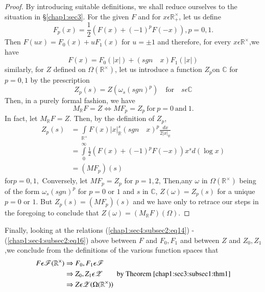 \begin{proof}
  By introducing suitable definitions, we shall reduce ourselves
  to the situation in \S \ref{chap1:sec3}.
  For the given $F$ and for $x\epsilon {\mathbb{R}_{+}^\times}$, let us
  define
  \begin{equation*}
    F_p(x)=\frac{1}{2}(F(x)+(-1)^{p}F(-x)),p=0,1.
    \tag{14}\label{chap1:sec4:subsec2:eq14} 
  \end{equation*}
  Then $F(ux)=F_{0}(x)+uF_1(x)$ for $u=\pm 1$ and therefore, for every
  $x\epsilon \mathbb{R}^\times$,we have
  \begin{equation*}
    F(x)=F_0(|x|)+(sgn\quad x)F_1(|x|)\tag{15}
    \label{chap1:sec4:subsec2:eq15}
  \end{equation*}
  similarly, for $Z$ defined on $\Omega(\mathbb{R}^\times)$, let us introduce
  a function $Z_p$on $\mathbb{C}$ for $p= 0,1$ by the prescription 
  \begin{equation*}
    Z_p(s)=Z(\omega_s(sgn)^p)\quad \text{for}\quad s\epsilon
    \mathbb{C} \tag{16} \label{chap1:sec4:subsec2:eq16}
  \end{equation*}
  Then, in a purely formal fashion, we have 
  \begin{equation*}
    M_{\mathbb{R}}F=Z\Leftrightarrow MF_p=Z_p ~\text{for}~ p=0 ~\text{and}~ 1.
  \end{equation*}
  In fact, let $M_{\mathbb{R}}F=Z$. Then, by the definition of $Z_p$,
  \begin{align*}
    Z_p(s) & =\int\limits_{\mathbb{R}^\times} F(x) |x|_\mathbb{R}^s(sgn\quad
    x)^p\frac{dx}{2|x|_{\mathbb{R}}}\\
    & =\int\limits_{0}^{\infty}\frac{1}{2}(F(x)+(-1)^{p}F(-x))x^{s}d(\log
    x)\\
    & =(M F_p)(s)
  \end{align*}
  for\pageoriginale $p=0,1,$ Conversely, let $MF_p=Z_p$ for $p=1,2$, Then,any $\omega$
  in $\Omega(\mathbb{R}^\times)$ being of the form $\omega_s(sgn)^p$ for
  $p=0$ or $1$ and $s$ in $\mathbb{C}$, $Z(\omega)=Z_p(s)$ for a unique
  $p=0$ or $1$. But $Z_p(s)=(MF_p)(s)$ and we have only to retrace our
  steps in the foregoing to conclude that
  $Z(\omega)=(M_{\mathbb{R}}F)(\Omega)$.
\end{proof}
Finally, looking at the relations
(\ref{chap1:sec4:subsec2:eq14}) - (\ref{chap1:sec4:subsec2:eq16}) above between $F$ and
$F_0,F_1$ and between $Z$ and $Z_0,Z_1$,we conclude from the
definitions of the various function spaces that 
\begin{align*}
  F\epsilon\mathscr{F}(\mathbb{R}^\times) &  \Rightarrow F_0,F_1\epsilon \mathscr{F}\\
  &  \Rightarrow Z_0,Z_1\epsilon \mathscr{Z}
  \qquad \text{by Theorem \ref{chap1:sec3:subsec1:thm1}}\\
  &  \Rightarrow Z \epsilon
  \mathscr{Z}(\Omega(\mathbb{R}^\times))
\end{align*}
